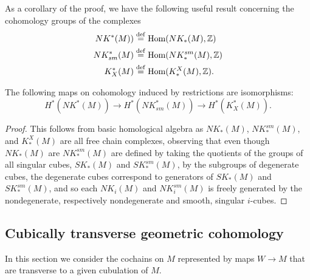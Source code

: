 As a corollary of the proof, we have the following useful result concerning the cohomology groups of the complexes
\begin{align*}
NK^*(M))& \stackrel{\mathrm{def}}{=} \textup{Hom}(NK_*(M),\mathbb{Z})\\
NK_{sm}^*(M)& \stackrel{\mathrm{def}}{=} \textup{Hom}(NK^{sm}_*(M),\mathbb{Z})\\
K^*_X(M)& \stackrel{\mathrm{def}}{=} \textup{Hom}(K^X_*(M),\mathbb{Z}).
\end{align*}

\begin{corollary}
The following maps on cohomology induced by restrictions are isomorphisms: $$H^*(NK^*(M)) \to H^*(NK_{sm}^*(M)) \to H^*(K^*_X(M)).$$
\end{corollary}
\begin{proof}
This follows from basic homological algebra \cite[Theorem 45.5]{Mun84} as $NK_*(M)$, $NK^{sm}_*(M)$, and $K^X_*(M)$ are all free chain complexes, observing that even though $NK_*(M)$ are $NK^{sm}_*(M)$ are defined by taking the quotients of the groups of all singular cubes, $SK_*(M)$ and $SK^{sm}_*(M)$, by the subgroups of degenerate cubes, the degenerate cubes correspond to generators of $SK_*(M)$ and $SK^{sm}_*(M)$, and so each $NK_i(M)$ and $NK^{sm}_i(M)$ is freely generated by the nondegenerate, respectively nondegenerate and smooth, singular $i$-cubes.
\end{proof}

\subsection{Cubically transverse geometric cohomology}\label{S: transverse cochains}

In this section we consider the cochains on $M$ represented by maps $W \to M$ that are transverse to a given cubulation of $M$.

